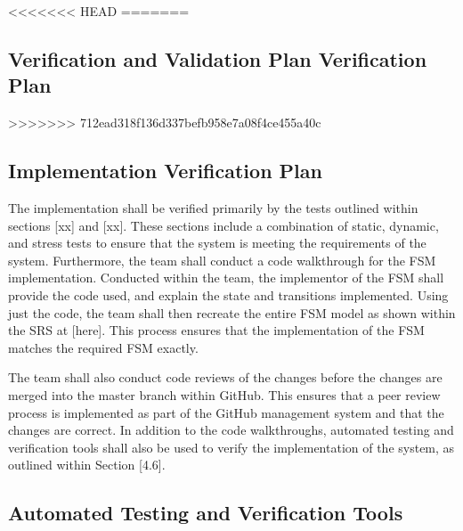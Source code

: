 \documentclass[12pt, titlepage]{article}
\begin{document}
<<<<<<< HEAD
=======

\subsection{Verification and Validation Plan Verification Plan}



>>>>>>> 712ead318f136d337befb958e7a08f4ce455a40c

\subsection{Implementation Verification Plan}

The implementation shall be verified primarily by the tests outlined within sections [xx] and [xx]. These sections include a combination of static, dynamic, and stress tests to ensure that the system is meeting the requirements of the system. Furthermore, the team shall conduct a code walkthrough for the FSM implementation. Conducted within the team, the implementor of the FSM shall provide the code used, and explain the state and transitions implemented. Using just the code, the team shall then recreate the entire FSM model as shown within the SRS at [here]. This process ensures that the implementation of the FSM matches the required FSM exactly.  

The team shall also conduct code reviews of the changes before the changes are merged into the master branch within GitHub. This ensures that a peer review process is implemented as part of the GitHub management system and that the changes are correct. In addition to the code walkthroughs, automated testing and verification tools shall also be used to verify the implementation of the system, as outlined within Section [4.6]. 


\subsection{Automated Testing and Verification Tools}
\end{document}
